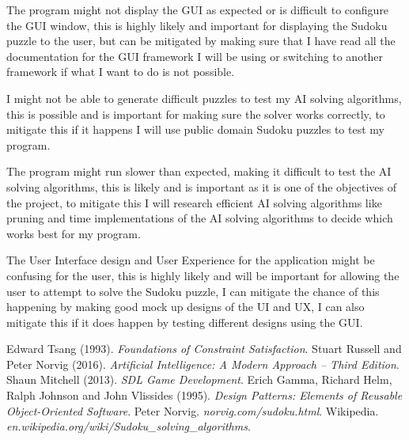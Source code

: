\documentclass[]{final_report}
\begin{document}
The program might not display the GUI as expected or is difficult to configure the GUI window, this is highly likely and important for displaying the Sudoku puzzle to the user, but can be mitigated by making sure that I have read all the documentation for the GUI framework I will be using or switching to another framework if what I want to do is not possible.

I might not be able to generate difficult puzzles to test my AI solving algorithms, this is possible and is important for making sure the solver works correctly, to mitigate this if it happens I will use public domain Sudoku puzzles to test my program.

The program might run slower than expected, making it difficult to test the AI solving algorithms, this is likely and is important as it is one of the objectives of the project, to mitigate this I will research efficient AI solving algorithms like pruning and time implementations of the AI solving algorithms to decide which works best for my program.

The User Interface design and User Experience for the application might be confusing for the user, this is highly likely and will be important for allowing the user to attempt to solve the Sudoku puzzle, I can mitigate the chance of this happening by making good mock up designs of the UI and UX, I can also mitigate this if it does happen by testing different designs using the GUI.



\newpage
\begin{thebibliography}{99}
 Edward Tsang (1993). \emph{Foundations of Constraint Satisfaction}.
 Stuart Russell and Peter Norvig (2016). \emph{Artificial Intelligence: A Modern Approach -- Third Edition}.
 Shaun Mitchell (2013). \emph{SDL Game Development}.
 Erich Gamma, Richard Helm, Ralph Johnson and John Vlissides (1995). \emph{Design Patterns: Elements of Reusable Object-Oriented Software}.
 Peter Norvig. \emph{norvig.com/sudoku.html}.
 Wikipedia. \emph{en.wikipedia.org/wiki/Sudoku\_solving\_algorithms}.
\end{thebibliography}
\label{endpage}
\end{document}
